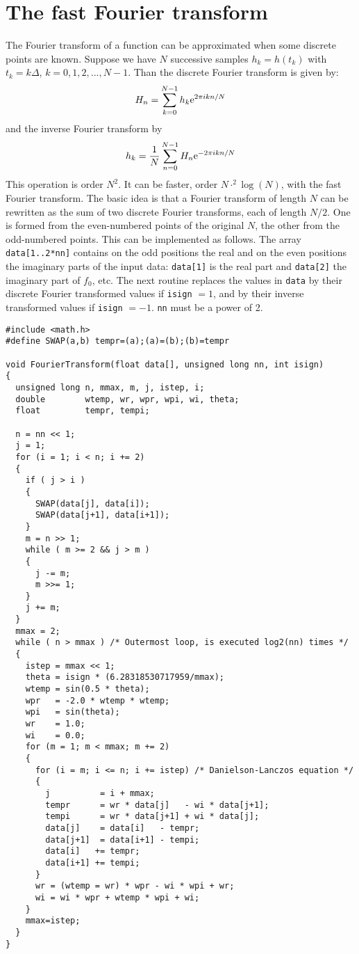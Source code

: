 \section{The fast Fourier transform}
The Fourier transform of a function can be approximated when some discrete
points are known. Suppose we have $N$ successive samples $h_k=h(t_k)$ with
$t_k=k\Delta$, $k=0,1,2,...,N-1$. Than the discrete Fourier transform is
given by:
\[
H_n=\sum_{k=0}^{N-1}h_k{\rm e}^{2\pi ikn/N}
\]
and the inverse Fourier transform by
\[
h_k=\frac{1}{N}\sum_{n=0}^{N-1}H_n{\rm e}^{-2\pi ikn/N}
\]
This operation is order $N^2$. It can be faster, order $N\cdot ^2\log(N)$,
with the fast Fourier transform. The basic idea is that a Fourier transform
of length $N$ can be rewritten as the sum of two discrete Fourier transforms,
each of length $N/2$. One is formed from the even-numbered points of
the original $N$, the other from the odd-numbered points.
\npar
This can be implemented as follows.
The array {\tt data[1..2*nn]} contains on the odd positions the real and on the
even positions the imaginary parts of the input data: {\tt data[1]}
is the real part and {\tt data[2]} the imaginary part of $f_0$, etc. The
next routine replaces the values in {\tt data} by their discrete Fourier
transformed values if {\tt isign} $=1$, and by their inverse transformed values
if {\tt isign} $=-1$. {\tt nn} must be a power of 2.
\begin{verbatim}
#include <math.h>
#define SWAP(a,b) tempr=(a);(a)=(b);(b)=tempr

void FourierTransform(float data[], unsigned long nn, int isign)
{
  unsigned long n, mmax, m, j, istep, i;
  double        wtemp, wr, wpr, wpi, wi, theta;
  float         tempr, tempi;

  n = nn << 1;
  j = 1;
  for (i = 1; i < n; i += 2)
  {
    if ( j > i )
    {
      SWAP(data[j], data[i]);
      SWAP(data[j+1], data[i+1]);
    }
    m = n >> 1;
    while ( m >= 2 && j > m )
    {
      j -= m;
      m >>= 1;
    }
    j += m;
  }
  mmax = 2;
  while ( n > mmax ) /* Outermost loop, is executed log2(nn) times */
  {
    istep = mmax << 1;
    theta = isign * (6.28318530717959/mmax);
    wtemp = sin(0.5 * theta);
    wpr   = -2.0 * wtemp * wtemp;
    wpi   = sin(theta);
    wr    = 1.0;
    wi    = 0.0;
    for (m = 1; m < mmax; m += 2)
    {
      for (i = m; i <= n; i += istep) /* Danielson-Lanczos equation */
      {
        j          = i + mmax;
        tempr      = wr * data[j]   - wi * data[j+1];
        tempi      = wr * data[j+1] + wi * data[j];
        data[j]    = data[i]   - tempr;
        data[j+1]  = data[i+1] - tempi;
        data[i]   += tempr;
        data[i+1] += tempi;
      }
      wr = (wtemp = wr) * wpr - wi * wpi + wr;
      wi = wi * wpr + wtemp * wpi + wi;
    }
    mmax=istep;
  }
}
\end{verbatim}



